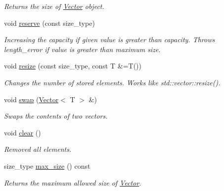 \begin{DoxyCompactItemize}
\begin{DoxyCompactList}\small\item\em Returns the size of \hyperlink{classtasks_1_1Vector}{Vector} object. \end{DoxyCompactList}\item 
void \hyperlink{classtasks_1_1Vector_aca54662e306045ae1eafc451df438e8a}{reserve} (const size\+\_\+type)
\begin{DoxyCompactList}\small\item\em Increasing the capacity if given value is greater than capacity. Throws length\+\_\+error if value is greater than maximum size. \end{DoxyCompactList}\item 
void \hyperlink{classtasks_1_1Vector_a0c8197f00637f4f0c389daa0abc6b990}{resize} (const size\+\_\+type, const T \&=T())
\begin{DoxyCompactList}\small\item\em Changes the number of stored elements. Works like std\+::vector\+::resize(). \end{DoxyCompactList}\item 
void \hyperlink{classtasks_1_1Vector_a991a168857cb8e67f893b143c01d67ec}{swap} (\hyperlink{classtasks_1_1Vector}{Vector}$<$ T $>$ \&)
\begin{DoxyCompactList}\small\item\em Swaps the contents of two vectors. \end{DoxyCompactList}\item 
void \hyperlink{classtasks_1_1Vector_a192cb827a7fc19b9a122bf89eeb91a25}{clear} ()\hypertarget{classtasks_1_1Vector_a192cb827a7fc19b9a122bf89eeb91a25}{}\label{classtasks_1_1Vector_a192cb827a7fc19b9a122bf89eeb91a25}

\begin{DoxyCompactList}\small\item\em Removed all elements. \end{DoxyCompactList}\item 
size\+\_\+type \hyperlink{classtasks_1_1Vector_aadcd7c943fd11e7f520e3b3ec75ef154}{max\+\_\+size} () const \hypertarget{classtasks_1_1Vector_aadcd7c943fd11e7f520e3b3ec75ef154}{}\label{classtasks_1_1Vector_aadcd7c943fd11e7f520e3b3ec75ef154}

\begin{DoxyCompactList}\small\item\em Returns the maximum allowed size of \hyperlink{classtasks_1_1Vector}{Vector}. \end{DoxyCompactList}\end{DoxyCompactItemize}


